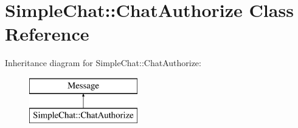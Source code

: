 \hypertarget{classSimpleChat_1_1ChatAuthorize}{\section{Simple\-Chat\-:\-:Chat\-Authorize Class Reference}
\label{classSimpleChat_1_1ChatAuthorize}
}
Inheritance diagram for Simple\-Chat\-:\-:Chat\-Authorize\-:\begin{figure}[H]
\begin{center}
\leavevmode
\includegraphics[height=2.000000cm]{classSimpleChat_1_1ChatAuthorize}
\end{center}
\end{figure}

